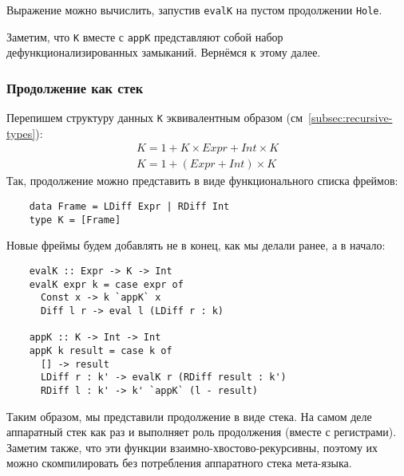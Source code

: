 Выражение можно вычислить, запустив \texttt{evalK} на пустом продолжении \texttt{Hole}.

Заметим, что \texttt{K} вместе с \texttt{appK} представляют собой набор дефункционализированных замыканий.
Вернёмся к этому далее. %

\subsubsection{Продолжение как стек}

Перепишем структуру данных \texttt{K} эквивалентным образом (см~\ref{subsec:recursive-types}):
\[
    \begin{array}{l}
        K = 1 + K \times Expr + Int \times K \\
        K = 1 + (Expr + Int) \times K
    \end{array}
\]
Так, продолжение можно представить в виде функционального списка фреймов:
\begin{verbatim}
    data Frame = LDiff Expr | RDiff Int
    type K = [Frame]
\end{verbatim}
Новые фреймы будем добавлять не в конец, как мы делали ранее, а в начало:
\begin{verbatim}
    evalK :: Expr -> K -> Int
    evalK expr k = case expr of
      Const x -> k `appK` x
      Diff l r -> eval l (LDiff r : k)

    appK :: K -> Int -> Int
    appK k result = case k of
      [] -> result
      LDiff r : k' -> evalK r (RDiff result : k')
      RDiff l : k' -> k' `appK` (l - result)
\end{verbatim}

Таким образом, мы представили продолжение в виде стека.
На самом деле аппаратный стек как раз и выполняет роль продолжения (вместе с регистрами).
Заметим также, что эти функции взаимно-хвостово-рекурсивны, поэтому их можно скомпилировать без потребления аппаратного стека мета-языка.










